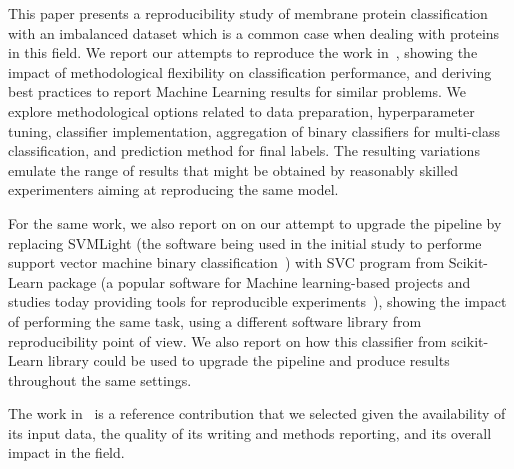 This paper presents a reproducibility study of membrane protein
classification with an imbalanced dataset which is a common case when 
dealing with proteins in this field. We report our attempts to reproduce the work
in~\cite{mishra2014prediction}, showing the impact of methodological
flexibility on classification performance, and deriving best practices to
report Machine Learning results for similar problems. We explore
methodological options related to data preparation, hyperparameter tuning,
classifier implementation, aggregation of binary classifiers for
multi-class classification, and prediction method for final labels. The
resulting variations emulate the range of results that might be obtained by
reasonably skilled experimenters aiming at reproducing the same model.


{For the same work, we also report on on our attempt to upgrade the pipeline
by replacing SVMLight (the software being used in the initial study 
to performe support vector machine binary classification~\cite{svmlight}) with SVC program 
from Scikit-Learn package (a popular software for Machine learning-based projects 
and studies today providing tools for reproducible experiments~\cite{scikitLearn}), showing 
the impact of performing the same task, using a different software library 
from reproducibility point of view. 
We also report on how this classifier from scikit-Learn library could be used 
to upgrade the pipeline and produce results throughout the same settings.}

The work in~\cite{mishra2014prediction}
 is a reference contribution that we selected given
the availability of its input data, the quality of its writing and methods
reporting, and its overall impact in the field. 

